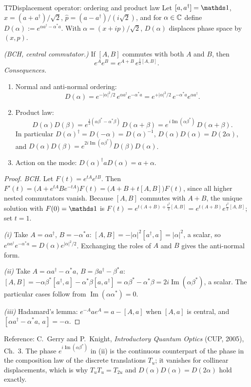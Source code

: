 \documentclass[11pt,a4paper,oneside,open=any,numbers=noenddot]{scrbook}
\begin{document}
\begin{tool}{T7}{Displacement operator: ordering and product law}
Let $[a,a^{\dagger}]=\id$, $\hat x=(a+a^{\dagger})/\sqrt2$, $\hat p=(a-a^{\dagger})/(i\sqrt2)$,
and for $\alpha\in\mathbb{C}$ define $D(\alpha):=e^{\alpha a^{\dagger}-\alpha^{*}a}$.
With $\alpha=(x+ip)/\sqrt2$, $D(\alpha)$ displaces phase space by $(x,p)$.

\emph{(BCH, central commutator.)} If $[A,B]$ commutes with both $A$ and $B$, then
\[
  e^{A}e^{B}=e^{A+B}\,e^{\frac12[A,B]} .
\]
\emph{Consequences.}
\begin{enumerate}[label=(\roman*)]
  \item Normal and anti-normal ordering:
        \[
          D(\alpha)=e^{-|\alpha|^{2}/2}\,e^{\alpha a^{\dagger}}e^{-\alpha^{*}a}
                   =e^{+|\alpha|^{2}/2}\,e^{-\alpha^{*}a}e^{\alpha a^{\dagger}} .
        \]
  \item Product law:
        \[
          D(\alpha)D(\beta)=e^{\frac12(\alpha\beta^{*}-\alpha^{*}\beta)}\,D(\alpha+\beta)
                           =e^{\,i\operatorname{Im}(\alpha\beta^{*})}\,D(\alpha+\beta) .
        \]
        In particular $D(\alpha)^{\dagger}=D(-\alpha)=D(\alpha)^{-1}$,
        $D(\alpha)D(\alpha)=D(2\alpha)$, and
        $D(\alpha)D(\beta)=e^{2i\operatorname{Im}(\alpha\beta^{*})}D(\beta)D(\alpha)$.
  \item Action on the mode: $D(\alpha)^{\dagger}aD(\alpha)=a+\alpha$.
\end{enumerate}
\end{tool}

\begin{proof}
\emph{BCH.} Let $F(t)=e^{tA}e^{tB}$. Then
$F'(t)=\bigl(A+e^{tA}Be^{-tA}\bigr)F(t)=\bigl(A+B+t[A,B]\bigr)F(t)$, since all higher
nested commutators vanish. Because $[A,B]$ commutes with $A+B$, the unique solution with
$F(0)=\id$ is $F(t)=e^{t(A+B)+\frac{t^{2}}{2}[A,B]}=e^{t(A+B)}e^{\frac{t^{2}}{2}[A,B]}$;
set $t=1$.

\emph{(i)} Take $A=\alpha a^{\dagger}$, $B=-\alpha^{*}a$: $[A,B]=-|\alpha|^{2}[a^{\dagger},a]
=|\alpha|^{2}$, a scalar, so
$e^{\alpha a^{\dagger}}e^{-\alpha^{*}a}=D(\alpha)e^{|\alpha|^{2}/2}$. Exchanging the roles
of $A$ and $B$ gives the anti-normal form.

\emph{(ii)} Take $A=\alpha a^{\dagger}-\alpha^{*}a$, $B=\beta a^{\dagger}-\beta^{*}a$:
$[A,B]=-\alpha\beta^{*}[a^{\dagger},a]-\alpha^{*}\beta[a,a^{\dagger}]
=\alpha\beta^{*}-\alpha^{*}\beta=2i\operatorname{Im}(\alpha\beta^{*})$, a scalar.
The particular cases follow from $\operatorname{Im}(\alpha\alpha^{*})=0$.

\emph{(iii)} Hadamard's lemma: $e^{-A}ae^{A}=a-[A,a]$ when $[A,a]$ is central, and
$[\alpha a^{\dagger}-\alpha^{*}a,\,a]=-\alpha$.
\end{proof}

\begin{remark}
Reference: C.~Gerry and P.~Knight, \emph{Introductory Quantum Optics} (CUP, 2005),
Ch.~3. The phase $e^{i\operatorname{Im}(\alpha\beta^{*})}$ in (ii) is the continuous
counterpart of the phase in the composition law of the discrete translations $T_u$;
it vanishes for collinear displacements, which is why $T_uT_u=T_{2u}$ and
$D(\alpha)D(\alpha)=D(2\alpha)$ hold exactly.
\end{remark}
\end{document}
